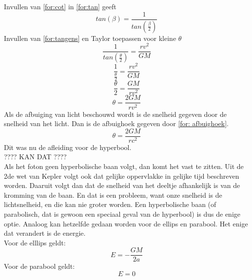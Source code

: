 Invullen van \cref{for:cot} in \cref{for:tan} geeft
\begin{equation}
    tan(\beta) = \frac{1}{tan(\frac{\beta}{2})}
    \label{for:afbuighoek}
\end{equation}
Invullen van \cref{for:tangens} en Taylor toepassen voor kleine $\theta$
$$\frac{1}{tan(\frac{\theta}{2})} = \frac{rv^{2}}{GM}$$
$$\frac{1}{\frac{\theta}{2}}=\frac{rv^{2}}{GM}$$
$$\frac{\theta}{2} = \frac{GM}{rv^{2}}$$
$$\theta = \frac{2GM}{rv^{2}}$$
Als de afbuiging van licht beschouwd wordt is de snelheid gegeven door de snelheid van het licht. Dan is de afbuighoek gegeven door \cref{for: afbuighoek}.
\begin{equation}
    \theta = \frac{2GM}{rc^{2}}
    \label{for: afbuighoek}
\end{equation}
Dit was nu de afleiding voor de hyperbool. 
\\ ???? KAN DAT ???? \\
Als het foton geen hyperbolische baan volgt, dan komt het vast te zitten. Uit de 2de wet van Kepler volgt ook dat gelijke oppervlakke in gelijke tijd beschreven worden. Daaruit volgt dan dat de snelheid van het deeltje afhankelijk is van de kromming van de baan. En dat is een probleem, want onze snelheid is de lichtsnelheid, en die kan nie groter worden. Een hyperbolische baan (of parabolisch, dat is gewoon een speciaal geval van de hyperbool) is dus de enige optie.
Analoog kan hetzelfde gedaan worden voor de ellips en parabool. Het enige dat verandert is de energie.\\
Voor de elllips geldt:
$$E=-\frac{GM}{2a}$$
Voor de parabool geldt:
$$E=0$$


